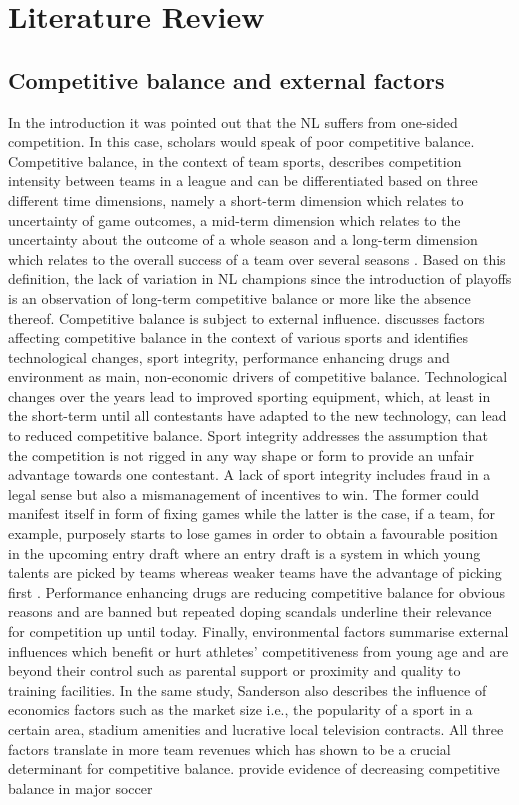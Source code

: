 \documentclass[12pt,a4paper]{article}\usepackage[]{graphicx}\usepackage[]{xcolor}
\begin{document}
\section{Literature Review}

\subsection{Competitive balance and external factors}

In the introduction it was pointed out that the NL suffers from one-sided competition. In this case, scholars would speak of poor competitive balance. Competitive balance, in the context of team sports, describes competition intensity between teams in a league and can be differentiated based on three different time dimensions, namely a short-term dimension which relates to uncertainty of game outcomes, a mid-term dimension which relates to the uncertainty about the outcome of a whole season and a long-term dimension which relates to the overall success of a team over several seasons \citep{walzel_teamsport_2019}. Based on this definition, the lack of variation in NL champions since the introduction of playoffs is an observation of long-term competitive balance or more like the absence thereof. Competitive balance is subject to external influence. \citet{sanderson_many_2002} discusses factors affecting competitive balance in the context of various sports and identifies technological changes, sport integrity, performance enhancing drugs and environment as main, non-economic drivers of competitive balance. Technological changes over the years lead to improved sporting equipment, which, at least in the short-term until all contestants have adapted to the new technology, can lead to reduced competitive balance. Sport integrity addresses the assumption that the competition is not rigged in any way shape or form to provide an unfair advantage towards one contestant. A lack of sport integrity includes fraud in a legal sense but also a mismanagement of incentives to win. The former could manifest itself in form of fixing games while the latter is the case, if a team, for example, purposely starts to lose games in order to obtain a favourable position in the upcoming entry draft where an entry draft is a system in which young talents are picked by teams whereas weaker teams have the advantage of picking first \citep[see][]{szymanski_economic_2003}. Performance enhancing drugs are reducing competitive balance for obvious reasons and are banned but repeated doping scandals underline their relevance for competition up until today. Finally, environmental factors summarise external influences which benefit or hurt athletes’ competitiveness from young age and are beyond their control such as parental support or proximity and quality to training facilities. In the same study, Sanderson also describes the influence of economics factors such as the market size i.e., the popularity of a sport in a certain area, stadium amenities and lucrative local television contracts. All three factors translate in more team revenues which has shown to be a crucial determinant for competitive balance. \citet{pawlowski_top_2010} provide evidence of decreasing competitive balance in major soccer 
\end{document}
